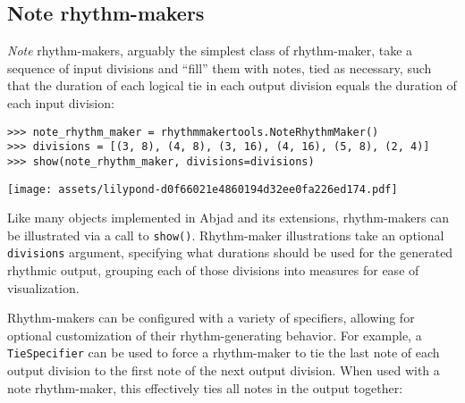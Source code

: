 \subsection{Note rhythm-makers}
\label{ssec:note-rhythm-makers}

\emph{Note} rhythm-makers, arguably the simplest class of rhythm-maker, take a
sequence of input divisions and \enquote{fill} them with notes, tied as
necessary, such that the duration of each logical tie in each output division
equals the duration of each input division:

\begin{comment}
<abjad>
note_rhythm_maker = rhythmmakertools.NoteRhythmMaker()
divisions = [(3, 8), (4, 8), (3, 16), (4, 16), (5, 8), (2, 4)]
show(note_rhythm_maker, divisions=divisions)
</abjad>
\end{comment}

\begin{abjadbookoutput}
\begin{singlespacing}
\vspace{-0.5\baselineskip}
\begin{lstlisting}
>>> note_rhythm_maker = rhythmmakertools.NoteRhythmMaker()
>>> divisions = [(3, 8), (4, 8), (3, 16), (4, 16), (5, 8), (2, 4)]
>>> show(note_rhythm_maker, divisions=divisions)
\end{lstlisting}
\noindent\texttt{[image: assets/lilypond-d0f66021e4860194d32ee0fa226ed174.pdf]}
\end{singlespacing}
\end{abjadbookoutput}

\noindent Like many objects implemented in Abjad and its extensions,
rhythm-makers can be illustrated via a call to \texttt{show()}. Rhythm-maker
illustrations take an optional \texttt{divisions} argument, specifying what
durations should be used for the generated rhythmic output, grouping each of
those divisions into measures for ease of visualization.

Rhythm-makers can be configured with a variety of specifiers, allowing for
optional customization of their rhythm-generating behavior. For example, a
\texttt{TieSpecifier} can be used to force a rhythm-maker to tie the last note
of each output division to the first note of the next output division. When
used with a note rhythm-maker, this effectively ties all notes in the output
together:

\begin{comment}
<abjad>
note_rhythm_maker = new(
    note_rhythm_maker,
    tie_specifier=rhythmmakertools.TieSpecifier(
        tie_across_divisions=True,
        ),
    )
show(note_rhythm_maker, divisions=divisions)
</abjad>
\end{comment}

